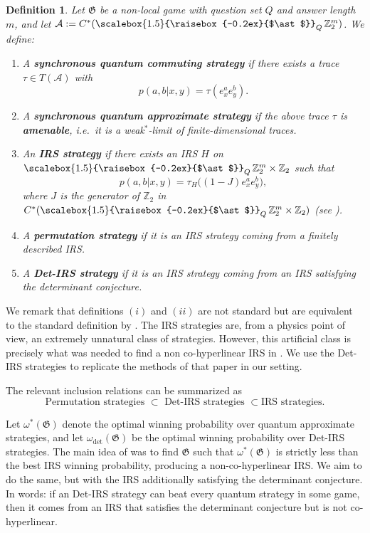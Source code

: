 \documentclass[pdflatex,sn-mathphys-num]{sn-jnl}%
\newtheorem{definition}[theorem]{Definition}
\newcommand{\Conv}{\mathop{\scalebox{1.5}{\raisebox{-0.2ex}{$\ast$}}}}
\begin{document}
\begin{definition}\label{def:3.2}
    Let $\mathfrak{G}$ be a non-local game with question set $Q$ and answer length $m$,  
    and let $\mathcal{A} := C^*(\Conv_Q \mathbb{Z}_2^m)$.  
    We define:
    \begin{enumerate}
        \item A \textbf{synchronous quantum commuting strategy} if there exists a trace $\tau \in T(\mathcal{A})$ with  
        \[
           p(a,b|x,y) = \tau(e_x^a e_y^b).
        \]

        \item A \textbf{synchronous quantum approximate strategy} if the above trace $\tau$ is \textbf{amenable},  
        i.e.\ it is a weak$^*$-limit of finite-dimensional traces.

        \item An \textbf{IRS strategy} if there exists an IRS $H$ on  
        $\Conv_Q \mathbb{Z}_2^m \times \mathbb{Z}_2$ such that
        \[
           p(a,b|x,y) = \tau_H \big( (1-J) e_x^a e_y^b \big),
        \]
        where $J$ is the generator of $\mathbb{Z}_2$ in $C^*(\Conv_Q \mathbb{Z}_2^m \times \mathbb{Z}_2)$  
        (see \cite{manzoor_there_2025}).

        \item A \textbf{permutation strategy} if it is an IRS strategy coming from a finitely described IRS.

        \item A \textbf{Det-IRS strategy} if it is an IRS strategy coming from an IRS satisfying the determinant conjecture.
    \end{enumerate}
\end{definition}
We remark that definitions $(i)$ and $(ii)$ are not standard but are equivalent to the standard definition by \cite[Theorem 3.5]{kim_synchronous_2018}. The IRS strategies are, from a physics point of view, an extremely unnatural class of strategies. However, this artificial class is precisely what was needed to find a non co-hyperlinear IRS in \cite{manzoor_there_2025}. We use the Det-IRS strategies to replicate the methods of that paper in our setting.

The relevant inclusion relations can be summarized as
\[
\text{Permutation strategies } \subset \text{ Det-IRS strategies } \subset \text{IRS strategies}.
\]  

Let $\omega^*(\mathfrak{G})$ denote the optimal winning probability over quantum approximate strategies,  
and let $\omega_{\mathrm{det}}(\mathfrak{G})$ be the optimal winning probability over Det-IRS strategies.  
The main idea of \cite{manzoor_there_2025} was to find $\mathfrak{G}$ such that  
$\omega^*(\mathfrak{G})$ is strictly less than the best IRS winning probability,  
producing a non-co-hyperlinear IRS.  
We aim to do the same, but with the IRS additionally satisfying the determinant conjecture.  
In words: if an Det-IRS strategy can beat every quantum strategy in some game, then it comes from an IRS that satisfies the determinant conjecture but is not co-hyperlinear.
\end{document}

